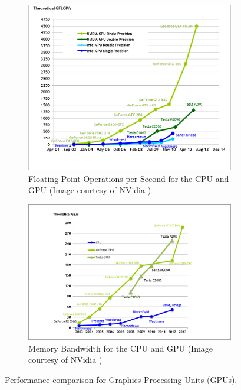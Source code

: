 \documentclass{report}
\begin{document}
\begin{figure}
\centering
\begin{subfigure}{0.6\textwidth}
\centering
\includegraphics[width=\textwidth]{gpu_content/nvidia_figures/floating-point-operations-per-second.png}
\caption{Floating-Point Operations per Second for the CPU and GPU (Image courtesy of NVidia \cite{CudaGuide2013})} 
\label{fig:floating-point-operations-per-second}
\end{subfigure}
\begin{subfigure}{0.6\textwidth}
\centering
\includegraphics[width=\textwidth]{gpu_content/nvidia_figures/memory-bandwidth.png}
\caption{Memory Bandwidth for the CPU and GPU (Image courtesy of NVidia \cite{CudaGuide2013})} 
\label{fig:memory-bandwidth}
\end{subfigure}
\caption{Performance comparison for Graphics Processing Units (GPUs).}
\end{figure}
\end{document}
